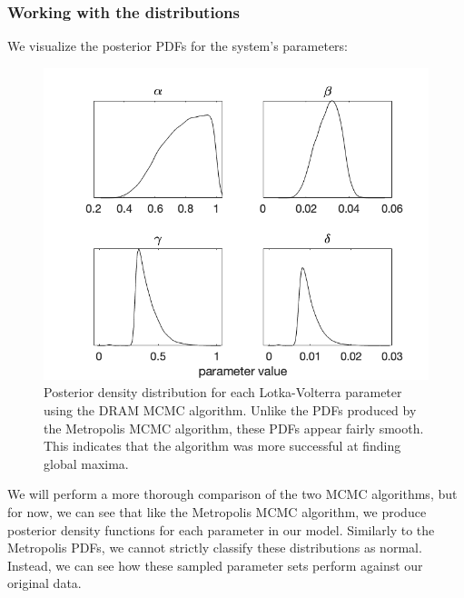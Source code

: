 \documentclass{article}
\begin{document}
\subsubsection{Working with the distributions}
We visualize the posterior PDFs for the system's parameters:
\begin{figure}[H]
    \centering
    \includegraphics[width=15cm]{MCMC_figs/met_lv_final/final_dram_den.png}
    \caption{Posterior density distribution for each Lotka-Volterra parameter using the DRAM MCMC algorithm. Unlike the PDFs produced by the Metropolis MCMC algorithm, these PDFs appear fairly smooth. This indicates that the algorithm was more successful at finding global maxima.}
    \label{fig:9mcmc}
\end{figure}
We will perform a more thorough comparison of the two MCMC algorithms, but for now, we can see that like the Metropolis MCMC algorithm, we produce posterior density functions for each parameter in our model. Similarly to the Metropolis PDFs, we cannot strictly classify these distributions as normal. Instead, we can see how these sampled parameter sets perform against our original data.
\end{document}
